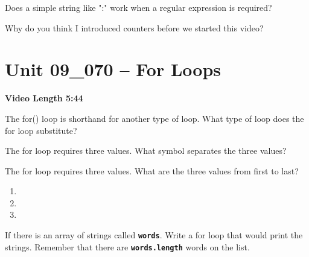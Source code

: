 \documentclass[letterpaper,12pt]{exam}
\newcommand{\unit}{Unit 09}
\begin{document}
\begin{questions}
\begin{samepage}
    \question Does a simple string like ":" work when a regular expression is required?
    \vspace{5mm}
\end{samepage}

\begin{samepage}
    \question Why do you think I introduced counters before we started this video?
    \vspace{5mm}
\end{samepage}

\section*{\unit\_070 -- For Loops} 
\par{\selectfont\textbf{Video Length 5:44}}

\begin{samepage}
    \question The for() loop is shorthand for another type of loop.  What type of loop does the for loop substitute?
    \vspace{5mm}
\end{samepage}
\begin{samepage}
    \question The for loop requires three values.  What symbol separates the three values?
    \vspace{5mm}
\end{samepage}

\begin{samepage}
    \question The for loop requires three values.  What are the three values from first to last?
      \begin{enumerate}
        \item 
        \vspace{5mm}
        \item 
        \vspace{5mm}
        \item 
        \vspace{5mm}
       \end{enumerate}
\end{samepage}
\begin{samepage}
    \question If there is an array of strings called \texttt{\textbf{words}}.  Write a for loop that would print the strings.  Remember that there are \texttt{\textbf{words.length}} words on the list.
    \vspace{5mm}
\end{samepage}


\begin{samepage}
    \question 
    \vspace{5mm}
\end{samepage}


\end{questions}
\end{document}
